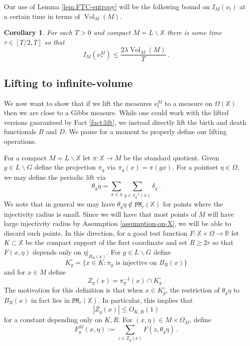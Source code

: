 \documentclass[11pt]{amsart}
\newtheorem{corollary}[theorem]{Corollary}
\theoremstyle{definition}
\theoremstyle{remark}
\newcommand{\R}{\mathbb{R}}
\newcommand{\bX}{\mathbb{X}}
\newcommand{\cP}{\mathtt{PM}}
\newcommand{\Vol}{\operatorname{Vol}}
\begin{document}
Our use of Lemma \ref{lem:FTC-entropy} will be the following bound on $I_M(\nu_t)$ at a certain time in terms of $\Vol_M(M)$.  \begin{corollary}\label{cor:bound-on-information}
    For each $T > 0$ and compact $M = L \backslash \bX$ there is some time $\tau \in [T/2,T]$ so that $$I_M(\nu_\tau^M) \leq \frac{2\lambda \Vol_M(M)}{T}\,.$$
\end{corollary}




\subsection{Lifting to infinite-volume}

We now want to show that if we lift the measures $\nu_t^M$ to a measure on $\Omega(\bX)$ then we are close to a Gibbs measure.  While one could work with the lifted versions guaranteed by Fact \ref{fact:lift}, we instead directly lift the birth and death functionals $B$ and $D$. We pause for a moment to properly define our lifting operations.

For a compact $M = L \backslash \bX$ let $\pi : \bX \to M$ be the standard quotient.  Given $g \in L \backslash G$ define the projection $\pi_g$ via $\pi_g(x) = \pi(gx)$.  For a pointset $\eta \in \Omega$, we may define the periodic lift via \begin{equation*}
    \theta_g \eta = \sum_{x \in \eta}\sum_{y \in \pi_g^{-1}(x)}\delta_y\,.
\end{equation*}
We note that in general we may have $\theta_g \eta \notin \cP_r(\bX)$ for points where the injectivity radius is small.  Since we will have that most points of $M$ will have large injectivity radius by Assumption \ref{assumption-on-X}, we will be able to discard such points.  In this direction, for a good test function $F: \bX \times \Omega \to \R$ let $K \subset \bX$ be the compact support of the first coordinate and set $R \geq 2r$ so that $F(x,\eta)$ depends only on $\eta|_{B_{R}(x)}$.  For $g \in L \backslash G$ define $$K_g^\circ = \{x \in  K : \pi_g \text{ is injective on }B_R(x)\}$$
and for $x\in M$ define
$$Z_g(x) = \pi_g^{-1}(x) \cap K_g^\circ\,.$$
The motivation for this definition is that when $x \in K_g^\circ$, the restriction of $\theta_g \eta$ to $B_R(x)$ in fact lies in $\cP_r(\bX)$.  In particular, this implies that \begin{equation}\label{eq:Z-bound}
	|Z_{g}(x)| \leq O_{K,R}(1)
\end{equation}
for a constant depending only on $K,R$.  For $(x,\eta)\in M\times \Omega_M$, define \begin{equation*}
	F_g^M(x,\eta) := \sum_{z \in Z_g(x)} F(z,\theta_g \eta)\,.
\end{equation*}
\end{document}
